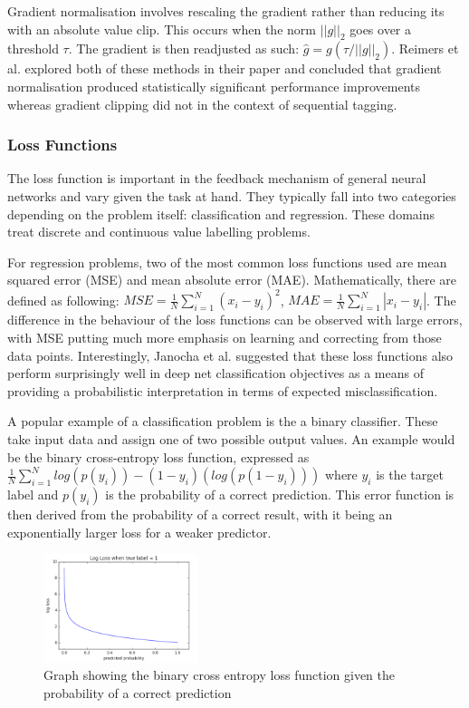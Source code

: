 \documentclass[10pt,onecolumn,letterpaper]{article}
\begin{document}
Gradient normalisation involves rescaling the gradient rather than reducing its with an absolute value clip. This occurs when the norm $||g||_{2}$ goes over a threshold $\tau$. The gradient is then readjusted as such: $\hat{g} = g(\tau/||g||_{2})$. Reimers et al.\cite{Reimers} explored both of these methods in their paper and concluded that gradient normalisation produced statistically significant performance improvements whereas gradient clipping did not in the context of sequential tagging.

\subsubsection{Loss Functions} \label{loss functions}

The loss function is important in the feedback mechanism of general neural networks and vary given the task at hand. They typically fall into two categories depending on the problem itself: classification and regression. These domains treat discrete and continuous value labelling problems. 

For regression problems, two of the most common loss functions used are mean squared error (MSE) and mean absolute error (MAE). Mathematically, there are defined as following: $MSE = \frac{1}{N}\sum_{i = 1}^{N}(x_{i}-y_{i})^2$, $MAE = \frac{1}{N}\sum_{i = 1}^{N}|x_{i}-y_{i}|$. The difference in the behaviour of the loss functions can be observed with large errors, with MSE putting much more emphasis on learning and correcting from those data points. Interestingly, Janocha et al.\cite{Janocha} suggested that these loss functions also perform surprisingly well in deep net classification objectives as a means of providing a probabilistic interpretation in terms of expected misclassification.

A popular example of a classification problem is the a binary classifier. These take input data and assign one of two possible output values. An example would be the binary cross-entropy loss function, expressed as $\frac{1}{N}\sum_{i = 1}^{N}log(p(y_{i}))-(1-y_{i})(log(p(1-y_{i})))$ where $y_{i}$ is the target label and $p(y_{i})$ is the probability of a correct prediction. This error function is then derived from the probability of a correct result, with it being an exponentially larger loss for a weaker predictor.  

\begin{figure}[!hbt!]
\centering
\includegraphics[width=4.5cm]{binary_log_loss.png}
\caption{Graph showing the binary cross entropy loss function given the probability of a correct prediction}
\end{figure}
\end{document}
